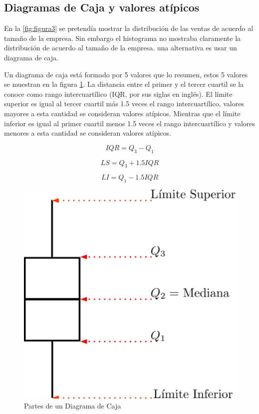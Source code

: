 \documentclass[letterpaper,]{book}
\begin{document}
\hypertarget{boxes}{%
\subsection{Diagramas de Caja y valores atípicos}\label{boxes}}

En la \ref{fig:figura3} se pretendía mostrar la distribución de las ventas de acuerdo al tamaño de la empresa. Sin embargo el histograma no mostraba claramente la distribución de acuerdo al tamaño de la empresa. una alternativa es usar un diagrama de caja.

Un diagrama de caja está formado por 5 valores que lo resumen, estos 5 valores se muestran en la figura \ref{fig:caja1}. La distancia entre el primer y el tercer cuartil se la conoce como rango intercuartílico (IQR, por sus siglas en inglés). El límite superior es igual al tercer cuartil más 1.5 veces el rango intercuartílico, valores mayores a esta cantidad se consideran valores atípicos. Mientras que el límite inferior es igual al primer cuartil menos 1.5 veces el rango intercuartílico y valores menores a esta cantidad se consideran valores atípicos.

\begin{equation} 
  IQR = Q_3 - Q_1
  \label{eq:iqr}
\end{equation}

\begin{equation} 
  LS = Q_3 + 1.5IQR
  \label{eq:ls}
\end{equation}

\begin{equation} 
  LI = Q_1 - 1.5IQR
  \label{eq:li}
\end{equation}

\begin{figure}[h!]

{\centering \includegraphics[width=0.4\linewidth]{boxplot3} 

}

\caption{Partes de un Diagrama de Caja}\label{fig:caja1}
\end{figure}
\end{document}
